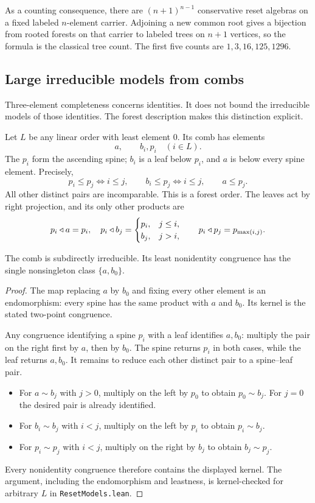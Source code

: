 As a counting consequence, there are $(n+1)^{n-1}$ conservative reset
algebras on a fixed labeled $n$-element carrier. Adjoining a new common
root gives a bijection from rooted forests on that carrier to labeled
trees on $n+1$ vertices, so the formula is the classical tree count.
The first five counts are $1,3,16,125,1296$.

\subsection{Large irreducible models from combs}

Three-element completeness concerns identities. It does not bound the
irreducible models of those identities. The forest description makes
this distinction explicit.

Let $L$ be any linear order with least element $0$. Its comb has
elements
\[
 a,\qquad b_i, p_i\quad(i\in L).
\]
The $p_i$ form the ascending spine; $b_i$ is a leaf below $p_i$,
and $a$ is below every spine element. Precisely,
\[
 p_i\leq p_j\Longleftrightarrow i\leq j,\qquad
 b_i\leq p_j\Longleftrightarrow i\leq j,\qquad a\leq p_j.
\]
All other distinct pairs are incomparable. This is a forest order.
The leaves act by right projection, and its only other products are
\[
 p_i\mathbin{\triangleleft} a=p_i,\quad
 p_i\mathbin{\triangleleft} b_j=
 \begin{cases}p_i,&j\leq i,\\b_j,&j>i,\end{cases}\qquad
 p_i\mathbin{\triangleleft} p_j=p_{\max(i,j)}.
\]

\begin{proposition}\label{reset:thm:comb}
The comb is subdirectly irreducible. Its least nonidentity congruence
has the single nonsingleton class $\{a,b_0\}$.
\end{proposition}
\begin{proof}
The map replacing $a$ by $b_0$ and fixing every other element is an
endomorphism: every spine has the same product with $a$ and $b_0$.
Its kernel is the stated two-point congruence.

Any congruence identifying a spine $p_i$ with a leaf identifies $a,b_0$:
multiply the pair on the right first by $a$, then by $b_0$.
The spine returns $p_i$ in both cases, while the leaf returns $a,b_0$.
It remains to reduce each other distinct pair to a spine--leaf pair.
\begin{itemize}
\item For $a\sim b_j$ with $j>0$, multiply on the left by $p_0$ to
obtain $p_0\sim b_j$. For $j=0$ the desired pair is already identified.
\item For $b_i\sim b_j$ with $i<j$, multiply on the left by $p_i$ to
obtain $p_i\sim b_j$.
\item For $p_i\sim p_j$ with $i<j$, multiply on the right by $b_j$
to obtain $b_j\sim p_j$.
\end{itemize}
Every nonidentity congruence therefore contains the displayed kernel.
The argument, including the endomorphism and leastness, is
kernel-checked for arbitrary $L$ in \texttt{ResetModels.lean}.
\end{proof}

